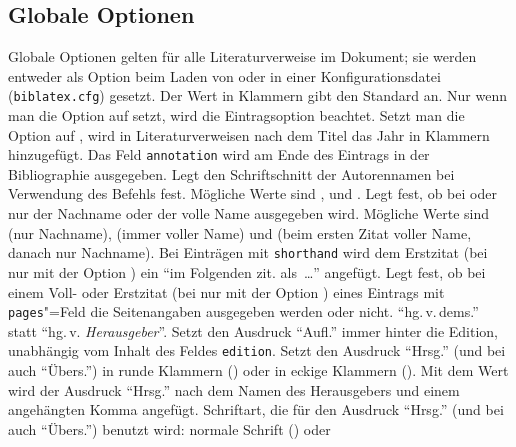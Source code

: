 \documentclass[ngerman]{scrartcl}
\begin{document}
\subsection{Globale Optionen}
Globale Optionen gelten für alle Literaturverweise im Dokument; sie werden entweder 
als Option beim Laden von \bl{} oder in einer Konfigurationsdatei (\texttt{biblatex.cfg}) 
gesetzt. Der Wert in Klammern gibt den Standard an.
	  Nur wenn man die Option auf  setzt, wird die Eintragsoption
	   beachtet.
	  Setzt man die Option auf , wird in Literaturverweisen nach dem Titel
	  das Jahr in Klammern hinzugefügt.
	  Das Feld \texttt{annotation} wird am Ende des Eintrags in der 
	  Bibliographie ausgegeben.
	  Legt den Schriftschnitt der Autorennamen bei Verwendung des Befehls 
	  fest. Mögliche Werte sind ,  und 
	  .
	  Legt fest, ob bei  oder  nur der Nachname oder der volle 
	  Name ausgegeben wird. Mögliche Werte sind  (nur Nachname), 
	  (immer voller Name) und  (beim ersten Zitat voller Name, danach nur 
	  Nachname).
	  Bei Einträgen mit \texttt{shorthand} wird dem Erstzitat (bei
	   nur mit der Option ) ein
	  \enquote{im Folgenden zit. als~\ldots} angefügt.
	  Legt fest, ob bei einem Voll- oder Erstzitat (bei  nur mit der 
	  Option ) eines Eintrags mit \texttt{pages}"=Feld die Seitenangaben 
	  ausgegeben werden oder nicht.
	  \enquote{hg.\,v.\,dems.} statt \enquote{hg.\,v. \emph{Herausgeber}}.
    Setzt den Ausdruck \enquote{Aufl.} immer hinter die Edition, unabhängig vom Inhalt
    des Feldes \texttt{edition}.
	  Setzt den Ausdruck \enquote{Hrsg.} (und bei 
	  auch \enquote{Übers.}) in runde Klammern () oder
	  in eckige Klammern (). Mit dem Wert  wird der
	  Ausdruck \enquote{Hrsg.} nach dem Namen des Herausgebers und einem
	  angehängten Komma angefügt.
    Schriftart, die für den Ausdruck \enquote{Hrsg.} (und bei 
	  auch \enquote{Übers.}) benutzt wird: normale Schrift () oder
\end{document}
